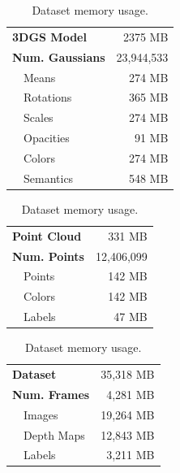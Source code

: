 \begin{table}[t!]
	\centering
	\small
	\begin{minipage}[t]{0.33\linewidth}
		\centering
		\caption{3DGS memory usage.}
		\label{tab:memory_usage_3dgs}
		\centering
		\begin{tabular}[t]{|lr|}
			\hline
			\textbf{3DGS Model}     & 2375 MB    \\
			\textbf{Num. Gaussians} & 23,944,533 \\
			\hline\hline
			~~Means                 & 274 MB     \\
			~~Rotations             & 365 MB     \\
			~~Scales                & 274 MB     \\
			~~Opacities             & 91 MB      \\
			~~Colors                & 274 MB     \\
			~~Semantics             & 548 MB     \\
			\hline
		\end{tabular}
	\end{minipage}%
	\begin{minipage}[t]{0.33\linewidth}
		\centering
		\caption{Point Cloud memory usage.}
		\label{tab:memory_usage_point_cloud}
		\begin{tabular}[t]{|lr|}
			\hline
			\textbf{Point Cloud} & 331 MB     \\
			\textbf{Num. Points} & 12,406,099 \\
			\hline\hline
			~~Points             & 142 MB     \\
			~~Colors             & 142 MB     \\
			~~Labels             & 47 MB      \\
			\hline
		\end{tabular}
	\end{minipage}
	\begin{minipage}[t]{0.33\linewidth}
		\centering
		\caption{Dataset memory usage.}
		\label{tab:memory_usage_dataset}
		\begin{tabular}[t]{|lr|}
			\hline
			\textbf{Dataset}     & 35,318 MB \\
			\textbf{Num. Frames} & 4,281 MB  \\ \hline\hline
			~~Images             & 19,264 MB \\
			~~Depth Maps         & 12,843 MB \\
			~~Labels             & 3,211 MB  \\
			\hline
		\end{tabular}
	\end{minipage}
\end{table}

